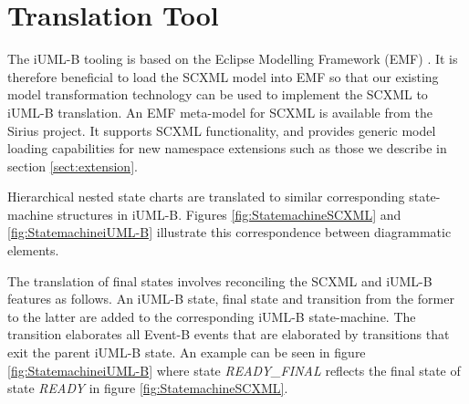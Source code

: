 
\section{Translation Tool}

The iUML-B tooling is based on the Eclipse Modelling Framework (EMF) \cite{steinberg2009emf}. 
It is therefore beneficial to load the SCXML model into EMF so that our existing model transformation technology can be used to 
implement the SCXML to iUML-B translation. 
An EMF meta-model for SCXML is available from the Sirius \cite{siriuswebsite} project. 
It supports SCXML functionality, and provides generic model
loading capabilities for new namespace extensions such as those we 
describe in section \ref{sect:extension}.

Hierarchical nested state charts are translated to similar corresponding  state-machine structures in iUML-B.  
Figures \ref{fig:StatemachineSCXML} and \ref{fig:StatemachineiUML-B} illustrate this correspondence between diagrammatic elements. 

The translation of final states involves reconciling the SCXML and iUML-B features as follows.
An iUML-B state, final state and transition from the former to the latter are  added to the corresponding iUML-B state-machine. 
The transition elaborates  all Event-B events that are elaborated by transitions that exit the parent  iUML-B state. 
An example can be seen in figure \ref{fig:StatemachineiUML-B} where state \emph{READY\_FINAL} reflects the final state of state \emph{READY} in figure \ref{fig:StatemachineSCXML}.





